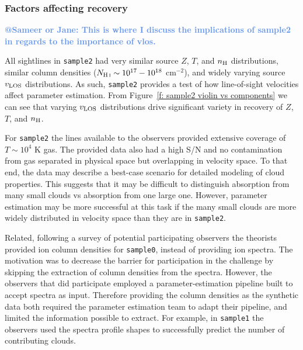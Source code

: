 \documentclass[fleqn,usenatbib]{mnras}
\makeatletter
\newcommand{\atsameer}[1]{\textcolor{CornflowerBlue}{\textbf{@Sameer or Jane: #1}}}
\makeatother
\begin{document}
\subsubsection{Factors affecting recovery}
\label{s: discussion -- cloud structure -- factors}

\atsameer{This is where I discuss the implications of sample2 in regards to the importance of vlos.}

All sightlines in \texttt{sample2} had very similar source $Z$, $T$, and $n_{\rm H}$ distributions,
similar column densities ($N_{\ion{H}{I}} \sim 10^{17}-10^{18}$ cm$^{-2}$),
and widely varying source $v_{\rm LOS}$ distributions. 
As such, \texttt{sample2} provides a test of how line-of-sight velocities affect parameter estimation.
From Figure~\ref{f: sample2 violin vs components} we can see that varying $v_{\rm LOS}$ distributions drive significant variety in recovery of $Z$, $T$, and $n_{\rm H}$.

For \texttt{sample2} the lines available to the observers provided extensive coverage of $T \sim 10^4$ K gas.
The provided data also had a high S/N and no contamination from gas separated in physical space but overlapping in velocity space.
To that end, the data may describe a best-case scenario for detailed modeling of cloud properties.
This suggests that it may be difficult to distinguish absorption from many small clouds vs absorption from one large one.
However, parameter estimation may be more successful at this task if the many small clouds are more widely distributed in velocity space than they are in \texttt{sample2}.

Related, following a survey of potential participating observers the theorists provided ion column densities for \texttt{sample0}, instead of providing ion spectra.
The motivation was to decrease the barrier for participation in the challenge by skipping the extraction of column densities from the spectra.
However, the observers that did participate employed a parameter-estimation pipeline built to accept spectra as input.
Therefore providing the column densities as the synthetic data both required the parameter estimation team to adapt their pipeline, and limited the information possible to extract.
For example, in \texttt{sample1} the observers used the spectra profile shapes to successfully predict the number of contributing clouds.
\end{document}
